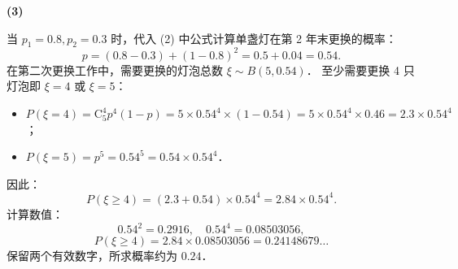 \begin{answer}
\textbf{(3)}

当 $p_1 = 0.8, p_2 = 0.3$ 时，代入 (2) 中公式计算单盏灯在第 2 年末更换的概率：
\nopagebreak[4]
\[
p = (0.8 - 0.3) + (1 - 0.8)^2 = 0.5 + 0.04 = 0.54.
\]
在第二次更换工作中，需要更换的灯泡总数 $\xi \sim B(5, 0.54)$．
至少需要更换 4 只灯泡即 $\xi = 4$ 或 $\xi = 5$：
\begin{itemize}
\item $P(\xi = 4) = \mathrm{C}_5^4 p^4 (1 - p) = 5 \times 0.54^4 \times (1 - 0.54) = 5 \times 0.54^4 \times 0.46 = 2.3 \times 0.54^4$；
\item $P(\xi = 5) = p^5 = 0.54^5 = 0.54 \times 0.54^4$．
\end{itemize}
因此：
\nopagebreak[4]
\[
P(\xi \geqslant 4) = (2.3 + 0.54) \times 0.54^4 = 2.84 \times 0.54^4.
\]
计算数值：
\nopagebreak[4]
\[
0.54^2 = 0.2916, \quad 0.54^4 = 0.08503056,
\]
\nopagebreak[4]
\[
P(\xi \geqslant 4) = 2.84 \times 0.08503056 = 0.24148679\dots
\]
保留两个有效数字，所求概率约为 $0.24$．




\end{answer}
